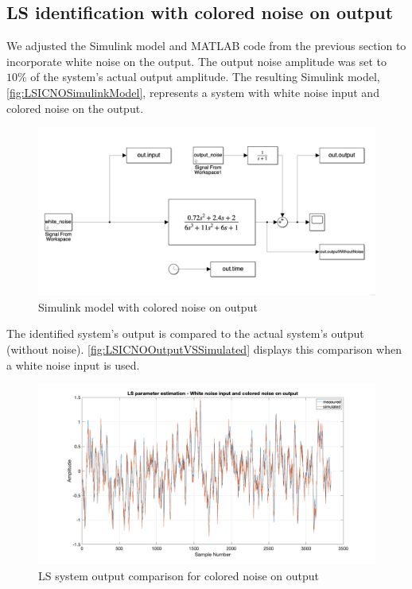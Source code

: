 \FloatBarrier
\subsection{LS identification with colored noise on output}
We adjusted the Simulink model and MATLAB code from the previous section to incorporate white noise on the output. The output noise amplitude was set to $10\%$ of the system's actual output amplitude. The resulting Simulink model, \autoref{fig:LSICNOSimulinkModel}, represents a system with white noise input and colored noise on the output.

\begin{figure}
	\centering
	\includegraphics[totalheight=8cm]{images/LSICNOSimulinkModel.png}
	\caption{Simulink model with colored noise on output}
	\label{fig:LSICNOSimulinkModel}
\end{figure}

The identified system's output is compared to the actual system's output (without noise). \autoref{fig:LSICNOOutputVSSimulated} displays this comparison when a white noise input is used.

\begin{figure}
	\centering
	\includegraphics[totalheight=8cm]{images/LSICNOOutputVSSimulated.png}
	\caption{LS system output comparison for colored noise on output}
	\label{fig:LSICNOOutputVSSimulated}
\end{figure}

